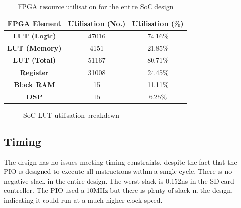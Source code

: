 \begin{table}[H]
    \centering
    \begin{tabular}{|c|c|c|}
        \hline
        \textbf{FPGA Element} & \textbf{Utilisation (No.)} & \textbf{Utilisation  (\%)} \\
        \hline
        \textbf{LUT (Logic)}  & 47016                      & 74.16\%                    \\
        \hline
        \textbf{LUT (Memory)} & 4151                       & 21.85\%                    \\
        \hline
        \textbf{LUT (Total)}  & 51167                      & 80.71\%                    \\
        \hline
        \textbf{Register}     & 31008                      & 24.45\%                    \\
        \hline
        \textbf{Block RAM}    & 15                         & 11.11\%                    \\
        \hline
        \textbf{DSP}          & 15                         & 6.25\%                     \\
        \hline
    \end{tabular}
    \caption{FPGA resource utilisation for the entire SoC design}
    \label{tab:soc-util}
\end{table}

\begin{figure}[H]
    \centering
    \caption{SoC LUT utilisation breakdown}
    \label{fig:pie}
\end{figure}

\subsection{Timing}

The design has no issues meeting timing constraints, despite the fact that the PIO is designed to execute all instructions within a single cycle. There is no negative slack in the entire design. The worst slack is 0.152ns in the SD card controller. The PIO used a 10MHz but there is plenty of slack in the design, indicating it could run at a much higher clock speed.

